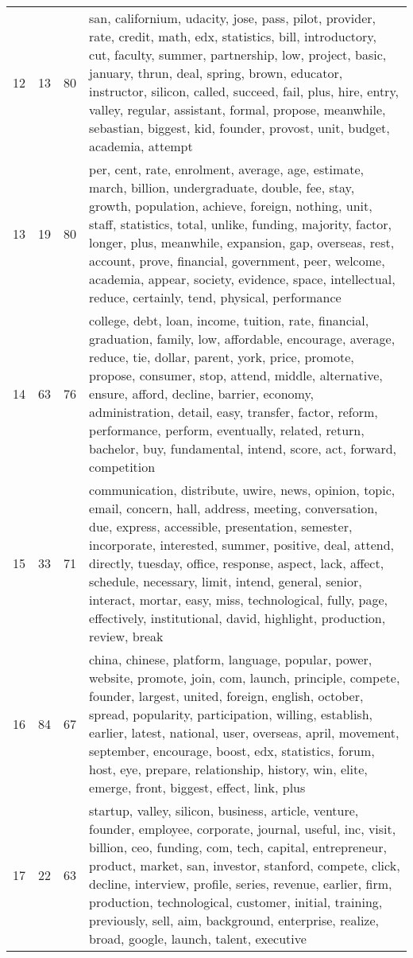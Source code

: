 \begin{table}[ht]
{\begin{tabularx}{\textwidth}{llrX}
   12 & 13 & 80 & san, californium, udacity, jose, pass, pilot, provider, rate, credit, math, edx, statistics, bill, introductory, cut, faculty, summer, partnership, low, project, basic, january, thrun, deal, spring, brown, educator, instructor, silicon, called, succeed, fail, plus, hire, entry, valley, regular, assistant, formal, propose, meanwhile, sebastian, biggest, kid, founder, provost, unit, budget, academia, attempt \\ 
   13 & 19 & 80 & per, cent, rate, enrolment, average, age, estimate, march, billion, undergraduate, double, fee, stay, growth, population, achieve, foreign, nothing, unit, staff, statistics, total, unlike, funding, majority, factor, longer, plus, meanwhile, expansion, gap, overseas, rest, account, prove, financial, government, peer, welcome, academia, appear, society, evidence, space, intellectual, reduce, certainly, tend, physical, performance \\ 
   14 & 63 & 76 & college, debt, loan, income, tuition, rate, financial, graduation, family, low, affordable, encourage, average, reduce, tie, dollar, parent, york, price, promote, propose, consumer, stop, attend, middle, alternative, ensure, afford, decline, barrier, economy, administration, detail, easy, transfer, factor, reform, performance, perform, eventually, related, return, bachelor, buy, fundamental, intend, score, act, forward, competition \\ 
   15 & 33 & 71 & communication, distribute, uwire, news, opinion, topic, email, concern, hall, address, meeting, conversation, due, express, accessible, presentation, semester, incorporate, interested, summer, positive, deal, attend, directly, tuesday, office, response, aspect, lack, affect, schedule, necessary, limit, intend, general, senior, interact, mortar, easy, miss, technological, fully, page, effectively, institutional, david, highlight, production, review, break \\ 
   16 & 84 & 67 & china, chinese, platform, language, popular, power, website, promote, join, com, launch, principle, compete, founder, largest, united, foreign, english, october, spread, popularity, participation, willing, establish, earlier, latest, national, user, overseas, april, movement, september, encourage, boost, edx, statistics, forum, host, eye, prepare, relationship, history, win, elite, emerge, front, biggest, effect, link, plus \\ 
   17 & 22 & 63 & startup, valley, silicon, business, article, venture, founder, employee, corporate, journal, useful, inc, visit, billion, ceo, funding, com, tech, capital, entrepreneur, product, market, san, investor, stanford, compete, click, decline, interview, profile, series, revenue, earlier, firm, production, technological, customer, initial, training, previously, sell, aim, background, enterprise, realize, broad, google, launch, talent, executive \\ 

\end{tabularx}}
\end{table}
